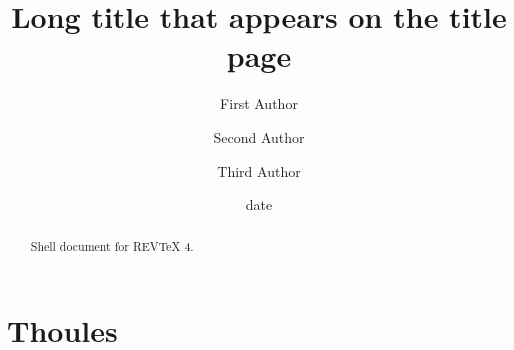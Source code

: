 \documentclass[aps,preprint]{revtex4}%
\begin{document}
\title[Short title for running header]{Long title that appears on the title page}
\author{First Author}
\author{Second Author}
\author{Third Author}

\begin{abstract}
Shell document for REV\TeX{} 4.

\end{abstract}
\date[Date text]{date}




\maketitle
\tableofcontents


\section{Thoules}%
\end{document}

